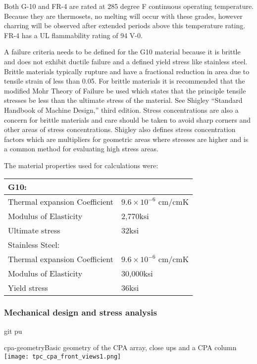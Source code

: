 Both G-10 and FR-4 are rated at 285 degree F continuous operating temperature. Because they are thermosets, no melting will occur with these grades, however charring will be observed after extended periods above this temperature rating. FR-4 has a UL flammability rating of 94 V-0.

A failure criteria needs to be defined for the G10 material because it is brittle and does not exhibit ductile failure and a defined yield stress like stainless steel.  Brittle materials typically rupture and have a fractional reduction in area due to tensile strain of less than 0.05.  For brittle materials it is recommended that the modified Mohr Theory of Failure be used which states that the principle tensile stresses be less than the ultimate stress of the material.  See Shigley ``Standard Handbook of Machine Design,'' third edition.   Stress concentrations are also a concern for brittle materials and care should be taken to avoid sharp corners and other areas of stress concentrations.  Shigley also defines stress concentration factors which are multipliers for geometric areas where stresses are higher and is a common method for evaluating high stress areas.  

The material properties used for calculations were:

\begin{tabular}{l l}
G10: 	& \\
\hline
Thermal expansion Coefficient	&	$9.6 \times 10^{-6}$ cm/cmK	\\
Modulus of Elasticity			&	2,770ksi				\\
\vspace{0.5em}Ultimate stress				&	32ksi				\\
Stainless Steel: & \\
\hline
Thermal expansion Coefficient	&	$9.6 \times 10^{-6}$ cm/cmK	\\
Modulus of Elasticity			&	30,000ksi				\\
Yield stress					&	36ksi				\\
\end{tabular}


\subsubsection{Mechanical design and stress analysis}
git pu
\begin{cdrfigure}{cpa-geometry}{Basic geometry of the CPA array, close ups and a CPA column} 
\texttt{[image: tpc\_cpa\_front\_views1.png]}
\end{cdrfigure}

